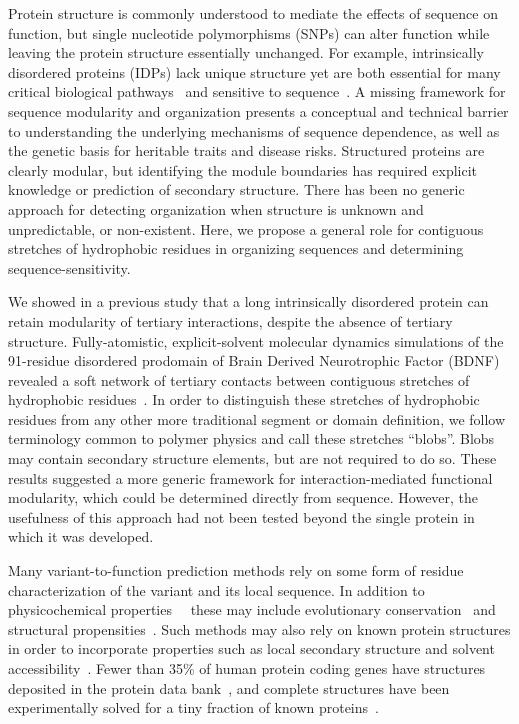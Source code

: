 \documentclass[9pt,twocolumn,twoside,lineno]{pnas-new}
\newcommand{\inserted}[1]{{#1}}
\begin{document}
Protein structure is commonly understood to mediate the effects of sequence on function, but single nucleotide polymorphisms (SNPs) can alter function while leaving the protein structure essentially unchanged. For example, intrinsically disordered proteins (IDPs) lack unique structure yet are both essential for many critical biological pathways~\citep {Ward2004,Dyson2005,Uversky2013,Uversky2019,Panchenko2015} and sensitive to sequence~\citep{Weinreb1996, Uverskya,CuanaloContreras2013,Patel2015,Uversky2015,TovoRodrigues2016}. \inserted{A missing framework for sequence modularity and organization presents a conceptual and technical barrier to understanding the underlying mechanisms of sequence dependence, as well as the genetic basis for heritable traits and disease risks.} Structured proteins are clearly modular, but identifying the module boundaries has required explicit knowledge or prediction of secondary structure.  There has been no generic approach for detecting organization when structure is unknown and unpredictable, or non-existent. Here, we propose a general role for contiguous stretches of hydrophobic residues in organizing sequences and determining sequence-sensitivity. 

We showed in a previous study that a long intrinsically disordered protein can retain modularity of tertiary interactions, despite the absence of tertiary structure. Fully-atomistic, explicit-solvent molecular dynamics simulations of the 91-residue disordered prodomain of Brain Derived Neurotrophic Factor (BDNF) revealed a soft network of tertiary contacts between contiguous stretches of hydrophobic residues~\citep{Lohia2019}. In order to distinguish these stretches of hydrophobic residues from any other more traditional segment or domain definition, we follow terminology common to polymer physics and call these stretches  ``blobs''. Blobs may contain secondary structure elements, but are not required to do so. \inserted{These results suggested a more generic framework for interaction-mediated functional modularity, which could be determined directly from sequence. However, the usefulness of this approach had not been tested beyond the single protein in which it was developed. }

Many variant-to-function prediction methods rely on some form of residue characterization of the variant and its local sequence. In addition to physicochemical properties~\citep{Stone2005, Niroula2015, LopezFerrando2017,Hecht2015,Popov2019}
~these may include evolutionary conservation~\citep{Ng2001, Thomas2004, Stone2005,Capriotti2006, Choi2012, Hecht2015, Niroula2015} and structural propensities~\citep{Capriotti2004,Capriotti2005, Parthiban2006, Wainreb2010,Popov2019, Ittisoponpisan2019,Iqbal2020}. Such methods may also rely on known protein structures in order to incorporate properties such as local secondary structure and solvent accessibility~\citep{Iqbal2020}. Fewer than 35\% of human protein coding genes have structures deposited in the protein data bank~\citep{Prlic2016}, and complete structures have been experimentally solved for a tiny fraction of known proteins~\citep{Rose2016,Mir2017}.   
\end{document}
